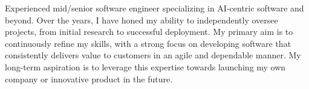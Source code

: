 \documentclass[9pt, green]{template/developercv} %
\begin{document}
\vspace{2.1mm}
{\small 
\hspace{10pt} 

	Experienced mid/senior software engineer specializing in AI-centric software and beyond. Over the years, I have honed my ability to independently oversee projects, from initial research to successful deployment. My primary aim is to continuously refine my skills, with a strong focus on developing software that consistently delivers value to customers in an agile and dependable manner. My long-term aspiration is to leverage this expertise towards launching my own company or innovative product in the future.

\vspace{2pt}
\vspace{2.1mm}
\begin{entrylist}


\end{entrylist}}
\end{document}
